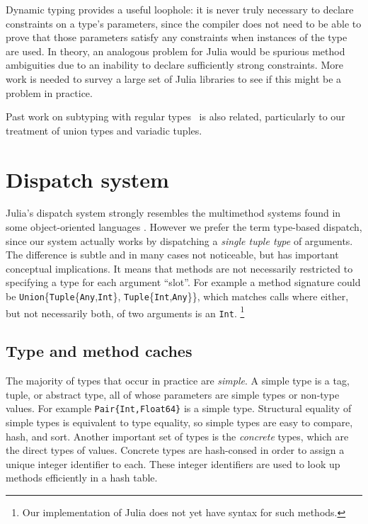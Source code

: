 Dynamic typing provides a useful loophole: it is never truly
necessary to declare constraints on a type's parameters, since
the compiler does not need to be able to prove that those
parameters satisfy any constraints when instances of the type are
used.
In theory, an analogous problem for Julia would be spurious method
ambiguities due to an inability to declare sufficiently strong
constraints.
More work is needed to survey a large set of Julia libraries to see
if this might be a problem in practice.

Past work on subtyping with regular
types~\cite{hosoya2000regular, xtatic} is also related, particularly
to our treatment of union types and variadic tuples.


\section{Dispatch system}


Julia's dispatch system strongly resembles the multimethod systems
found in some object-oriented languages
\cite{closspec,closoverview,dylanlang,cecil,cecilspec,chambers2006diesel}.
However we prefer the term type-based dispatch, since our system
actually works by dispatching a \emph{single tuple type} of arguments.
The difference is subtle and in many cases not noticeable, but has
important conceptual implications.
It means that methods are not necessarily restricted to specifying
a type for each argument ``slot''.
For example a method signature could be
\texttt{Union}\{\texttt{Tuple}\{\texttt{Any},\texttt{Int}\}, \texttt{Tuple}\{\texttt{Int},\texttt{Any}\}\},
which matches calls where either, but not necessarily both, of two
arguments is an \texttt{Int}.
\footnote{Our implementation of Julia does not yet have syntax for such methods.}

\subsection{Type and method caches}

The majority of types that occur in practice are \emph{simple}.
A simple type is a tag, tuple, or abstract type, all of whose parameters
are simple types or non-type values.
For example \texttt{Pair\{Int,Float64\}} is a simple type.
Structural equality of simple types is equivalent to type equality,
so simple types are easy to compare, hash, and sort.
Another important set of types is the \emph{concrete} types, which
are the direct types of values.
Concrete types are hash-consed in order to assign a unique integer
identifier to each.
These integer identifiers are used to look up methods efficiently
in a hash table.

